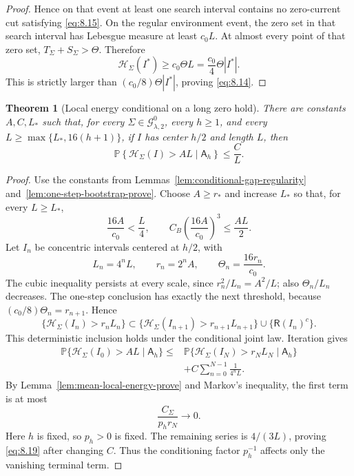 \documentclass[11pt,reqno]{amsart}
\newtheorem{theorem}{Theorem}[section]
\theoremstyle{definition}
\theoremstyle{remark}
\numberwithin{equation}{section}
\newcommand{\Pp}{\mathbb P}
\begin{document}
\begin{proof}
Hence on that event at least one search interval contains no zero-current cut satisfying
\eqref{eq:8.15}.  On the regular environment event, the zero set in that search interval has
Lebesgue measure at least \(c_0L\).  At almost every point of that zero set,
\(T_\Sigma+S_\Sigma>\Theta\).  Therefore
\[
\mathcal H_\Sigma(I^*)\ge c_0\Theta L
=\frac{c_0}{4}\Theta|I^*|.
\]
This is strictly larger than \((c_0/8)\Theta|I^*|\), proving \eqref{eq:8.14}.
\end{proof}

\begin{theorem}[Local energy conditional on a long zero hold]
\label{thm:conditional-gap-energy}
There are constants \(A,C,L_*\) such that, for every
\(\Sigma\in\mathcal G_{\lambda,2}^0\), every \(h\ge1\), and
every \(L\ge\max\{L_*,16(h+1)\}\), if \(I\) has center
\(h/2\) and length \(L\), then
\begin{equation}
\Pp\left\{
\mathcal H_\Sigma(I)>AL\mid\mathsf A_h\right\}\le \frac{C}{L}.
\label{eq:8.19}
\end{equation}
\end{theorem}

\begin{proof}
Use the constants from Lemmas~\ref{lem:conditional-gap-regularity}
and~\ref{lem:one-step-bootstrap-prove}. Choose \(A\ge r_*\) and
increase \(L_*\) so that, for every \(L\ge L_*\),
\[
\frac{16A}{c_0}<\frac L4,
\qquad
C_B\left(\frac{16A}{c_0}\right)^3\le\frac{AL}{2}.
\]
Let \(I_n\) be concentric intervals centered at \(h/2\), with
\[
L_n=4^nL,\qquad r_n=2^nA,\qquad
\Theta_n=\frac{16r_n}{c_0}.
\]
The cubic inequality persists at every scale, since \(r_n^2/L_n=A^2/L\);
also \(\Theta_n/L_n\) decreases. The one-step conclusion has exactly
the next threshold, because \((c_0/8)\Theta_n=r_{n+1}\). Hence
\[
\{\mathcal H_\Sigma(I_n)>r_nL_n\}
\subset
\{\mathcal H_\Sigma(I_{n+1})>r_{n+1}L_{n+1}\}
\cup\{\mathsf R(I_n)^c\}.
\]
This deterministic inclusion holds under the conditional joint law.
Iteration gives
\begin{equation}
\begin{aligned}
\Pp\{\mathcal H_\Sigma(I_0)>AL\mid\mathsf A_h\}
\le{}&\Pp\{\mathcal H_\Sigma(I_N)>r_NL_N\mid\mathsf A_h\}\\
&+C\sum_{n=0}^{N-1}\frac1{4^nL}.
\end{aligned}
\label{eq:8.20}
\end{equation}
By Lemma~\ref{lem:mean-local-energy-prove} and Markov's inequality,
the first term is at most
\[
\frac{C_\Sigma}{p_h r_N}\longrightarrow0.
\]
Here \(h\) is fixed, so \(p_h>0\) is fixed. The remaining series is
\(4/(3L)\), proving \eqref{eq:8.19} after changing \(C\). Thus the conditioning
factor \(p_h^{-1}\) affects only the vanishing terminal term.
\end{proof}
\end{document}
